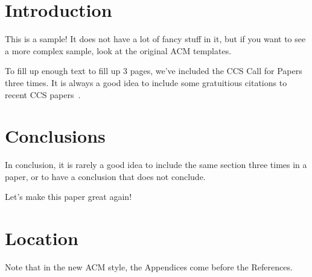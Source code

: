\section{Introduction}

This is a sample!  It does not have a lot of fancy stuff in it, but if
you want to see a more complex sample, look at the original ACM
templates.

To fill up enough text to fill up 3 pages, we've included the CCS Call
for Papers three times.  It is always a good idea to include some
gratuitious citations to recent CCS papers~\cite{medvinsky1993netcash,
  bellare1993random, anderson1993cryptosystems, blaze1993cryptographic}.





\section{Conclusions}

In conclusion, it is rarely a good idea to include the same section three times in a paper, or to have a conclusion that does not conclude.

Let's make this paper great again!


\appendix

\section{Location}

Note that in the new ACM style, the Appendices come before the References.



\begin{acks}
\end{acks}
